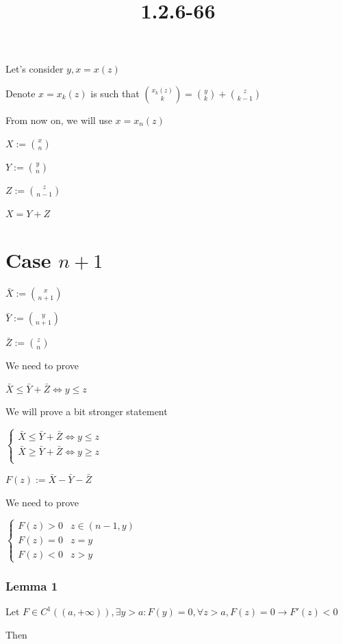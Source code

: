 \documentclass{article}
\title{1.2.6-66}
\begin{document}
\maketitle

Let's consider \( y, x = x(z) \)

Denote \( x = x_k(z) \) is such that \( \binom{x_k(z)}{k} = \binom{y}{k} + \binom{z}{k-1} \)

From now on, we will use \( x = x_n(z) \)

\( X := \binom{x}{n} \)

\( Y := \binom{y}{n} \)

\( Z := \binom{z}{n-1} \)

\( X = Y + Z \)

\section*{Case \( n + 1 \)}

\( \bar{X} := \binom{x}{n+1} \)

\( \bar{Y} := \binom{y}{n+1} \)

\( \bar{Z} := \binom{z}{n} \)

We need to prove

\( \bar{X} \leq \bar{Y} + \bar{Z} \iff y \leq z \)

We will prove a bit stronger statement

\( \left\{\begin{array}{l}\bar{X} \leq \bar{Y} + \bar{Z} \iff y \leq z\\\bar{X} \geq \bar{Y} + \bar{Z} \iff y \geq z\\\end{array}\right. \)

\( F(z) := \bar{X} - \bar{Y} - \bar{Z} \)

We need to prove

\( \begin{cases}F(z)>0 & z\in(n-1,y)\\ F(z)=0 & z=y\\ F(z)<0 & z>y\end{cases} \)

\subsubsection*{Lemma 1}

Let \( F \in C^1((a, +\infty)), \exists y > a: F(y) = 0, \forall z > a, F(z) = 0 \rightarrow F'(z) < 0 \)

Then
\end{document}
